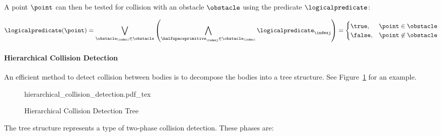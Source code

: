 			A point $\point$ can then be tested for collision with an obstacle
			$\obstacle$ using the predicate $\logicalpredicate$:

			\begin{equation}
				\logicalpredicate(\point) =
					\bigvee_{\obstacle_{\indexi} \in \obstacle}
						\left(
							\bigwedge_{\halfspaceprimitive_{\indexj} \in \obstacle_{\indexi}}
								\logicalpredicate_{\indexj}
						\right)
				=
				\begin{cases}
					\true,  &\point \in\obstacle \\
					\false, &\point \not\in \obstacle
				\end{cases}
				\label{eq:collision_point_with_obstacle}
			\end{equation}

			\paragraph{Hierarchical Collision Detection}%
			\label{sec:hierarchical_collision_detection}

				An efficient method to detect collision between bodies is to
				decompose the bodies into a tree structure. See
				Figure~\ref{fig:hierarchical_collision_detection_tree} for an
				example.

				\begin{figure}[htb]
					\centering
					\def\svgwidth{\columnwidth}
					{hierarchical_collision_detection.pdf_tex}
					\caption{Hierarchical Collision Detection Tree}%
					\label{fig:hierarchical_collision_detection_tree}
				\end{figure}

				The tree structure represents a type of two-phase collision
				detection. These phases are:

